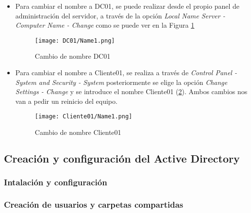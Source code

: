 \begin{itemize}
\item Para cambiar el nombre a DC01, se puede realizar desde el propio panel de administración del servidor, a través de la opción {\it Local Name Server - Computer Name - Change} como se puede ver en la Figura \ref{DC01-Name1}
\begin{figure}[H] %
\begin{center}
\texttt{[image: DC01/Name1.png]}
\end{center}
\caption{Cambio de nombre DC01}
\label{DC01-Name1}
\end{figure}

\item Para cambiar el nombre a Cliente01, se realiza a través de {\it Control Panel - System and Security - System} posteriormente se elige la opción {\it Change Settings - Change} y se introduce el nombre Cliente01 (\ref{Cliente01-Name1}). Ambos cambios nos van a pedir un reinicio del equipo.  
\begin{figure}[H] %
\begin{center}
\texttt{[image: Cliente01/Name1.png]}
\end{center}
\caption{Cambio de nombre Cliente01}
\label{Cliente01-Name1}
\end{figure}

\end{itemize}

\subsection{Creación y configuración del Active Directory}

\subsubsection{Intalación y configuración}
\subsubsection{Creación de usuarios y carpetas compartidas}
